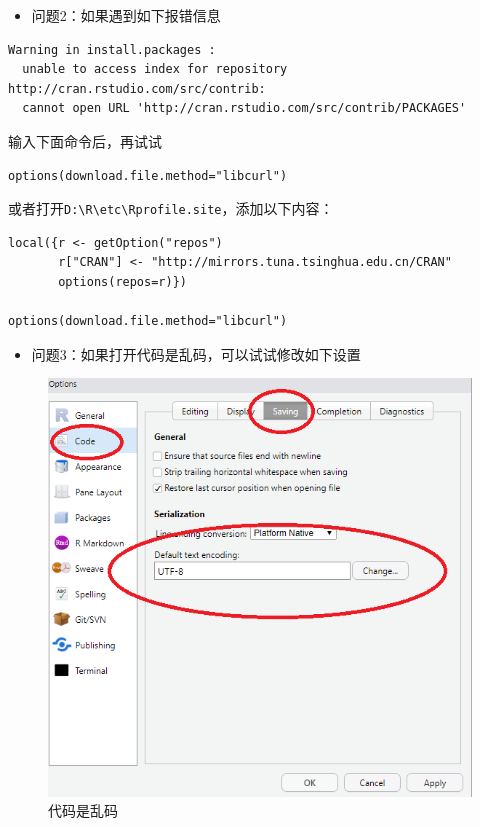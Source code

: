 \documentclass[
]{book}
\providecommand{\tightlist}{%
  \setlength{\itemsep}{0pt}\setlength{\parskip}{0pt}}
\begin{document}
\begin{itemize}
\tightlist
\item
  问题2：如果遇到如下报错信息
\end{itemize}

\begin{verbatim}
Warning in install.packages :
  unable to access index for repository http://cran.rstudio.com/src/contrib:
  cannot open URL 'http://cran.rstudio.com/src/contrib/PACKAGES'
\end{verbatim}

输入下面命令后，再试试

\begin{verbatim}
options(download.file.method="libcurl")
\end{verbatim}

或者打开\texttt{D:\textbackslash{}R\textbackslash{}etc\textbackslash{}Rprofile.site}，添加以下内容：

\begin{verbatim}
local({r <- getOption("repos")
       r["CRAN"] <- "http://mirrors.tuna.tsinghua.edu.cn/CRAN"
       options(repos=r)})

options(download.file.method="libcurl")
\end{verbatim}

\begin{itemize}
\tightlist
\item
  问题3：如果打开代码是乱码，可以试试修改如下设置
\end{itemize}

\begin{figure}
\centering
\includegraphics{figure/18.png}
\caption{代码是乱码}
\end{figure}
\end{document}
